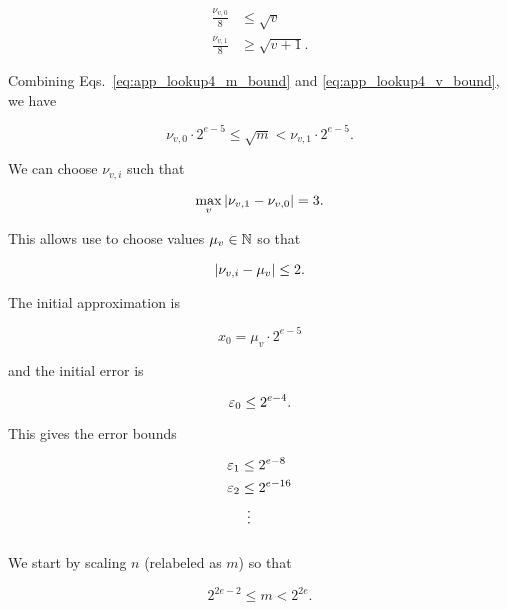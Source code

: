 \begin{align}
    \frac{\nu_{v,0}}{8} &\le \sqrt{v} \nonumber\\
    \frac{\nu_{v,1}}{8} &\ge \sqrt{v+1}.
    \label{eq:app_lookup4_v_bound}
\end{align}

\noindent
Combining Eqs.~\eqref{eq:app_lookup4_m_bound} and
\eqref{eq:app_lookup4_v_bound},
we have

\begin{equation}
    \nu_{v,0}\cdot2^{e-5} \le \sqrt{m} < \nu_{v,1}\cdot2^{e-5}.
\end{equation}

\noindent
We can choose $\nu_{v,i}$ such that

\begin{equation}
    \max_{v} \left| \nu_{v,1} - \nu_{v,0} \right| = 3.
\end{equation}

\noindent
This allows use to choose values $\mu_{v}\in\mathbb{N}$ so that

\begin{equation}
    \left| \nu_{v,i} - \mu_{v} \right| \le 2.
\end{equation}

The initial approximation is

\begin{equation}
    x_{0} = \mu_{v}\cdot2^{e-5}
\end{equation}

\noindent
and the initial error is

\begin{equation}
    \varepsilon_{0} \le 2^{e-4}.
\end{equation}

\noindent
This gives the error bounds

\begin{align}
    \varepsilon_{1} &\le 2^{e-8} \nonumber\\
    \varepsilon_{2} &\le 2^{e-16} \nonumber\\
        &\ \vdots
\end{align}


\subsubsection{\LookupEight{}}
\label{app:error_bounds:lookup8}

We start by scaling $n$ (relabeled as $m$) so that

\begin{equation}
    2^{2e-2} \le m < 2^{2e}.
\end{equation}

